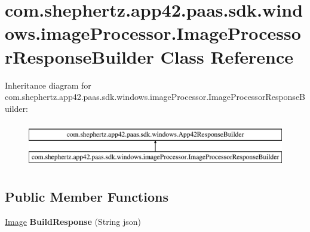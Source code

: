 \hypertarget{classcom_1_1shephertz_1_1app42_1_1paas_1_1sdk_1_1windows_1_1image_processor_1_1_image_processor_response_builder}{\section{com.\+shephertz.\+app42.\+paas.\+sdk.\+windows.\+image\+Processor.\+Image\+Processor\+Response\+Builder Class Reference}
\label{classcom_1_1shephertz_1_1app42_1_1paas_1_1sdk_1_1windows_1_1image_processor_1_1_image_processor_response_builder}
}
Inheritance diagram for com.\+shephertz.\+app42.\+paas.\+sdk.\+windows.\+image\+Processor.\+Image\+Processor\+Response\+Builder\+:\begin{figure}[H]
\begin{center}
\leavevmode
\includegraphics[height=2.000000cm]{classcom_1_1shephertz_1_1app42_1_1paas_1_1sdk_1_1windows_1_1image_processor_1_1_image_processor_response_builder}
\end{center}
\end{figure}
\subsection*{Public Member Functions}
\begin{DoxyCompactItemize}
\item 
\hypertarget{classcom_1_1shephertz_1_1app42_1_1paas_1_1sdk_1_1windows_1_1image_processor_1_1_image_processor_response_builder_afb8cffa8e0bec729ee7ef3c766cebb9b}{\hyperlink{classcom_1_1shephertz_1_1app42_1_1paas_1_1sdk_1_1windows_1_1image_processor_1_1_image}{Image} {\bfseries Build\+Response} (String json)}\label{classcom_1_1shephertz_1_1app42_1_1paas_1_1sdk_1_1windows_1_1image_processor_1_1_image_processor_response_builder_afb8cffa8e0bec729ee7ef3c766cebb9b}

\end{DoxyCompactItemize}
